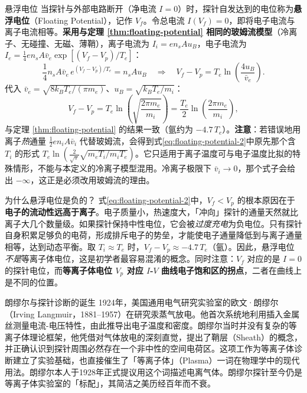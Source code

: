 \documentclass[12pt,a4paper,openany,oneside]{book}
\begin{document}
\begin{definition}{悬浮电位}{}{}
当探针与外部电路断开（净电流 $I = 0$）时，探针自发达到的电位称为\textbf{悬浮电位}（Floating Potential），记作 $V_f$。令总电流 $I(V_f)=0$，即将电子电流与离子电流相等。\textbf{采用与定理 \ref{thm:floating-potential} 相同的玻姆流模型}（冷离子、无碰撞、无磁、薄鞘），离子电流为 $I_i = e n_s A u_B$，电子电流为 $I_e = \frac14 en_sA\bar v_e\exp[(V_f-V_p)/T_e]$：
\begin{equation}
\frac{1}{4}n_sA\bar v_e\,e^{(V_f-V_p)/T_e} = n_s A u_B
\quad\Longrightarrow\quad
V_f - V_p = T_e \ln\!\left(\frac{4u_B}{\bar v_e}\right).
\label{eq:floating-potential-2}
\end{equation}
代入 $\bar v_e = \sqrt{8k_BT_e/(\pi m_e)}$、$u_B=\sqrt{k_BT_e/m_i}$：
\begin{equation}
V_f - V_p = T_e \ln\!\left(\sqrt{\frac{2\pi m_e}{m_i}}\right)
= \frac{T_e}{2}\ln\!\left(\frac{2\pi m_e}{m_i}\right),
\end{equation}
与定理 \ref{thm:floating-potential} 的结果一致（氩约为 $-4.7\,T_e$）。\textbf{注意}：若错误地用离子\emph{热}通量 $\frac12 en_iA\bar v_i$ 代替玻姆流，会得到式\eqref{eq:floating-potential-2}中原先那个含 $T_i$ 的形式 $T_e\ln\!\left(\frac{2}{\sqrt\pi}\sqrt{m_eT_i/m_iT_e}\right)$。它只适用于离子温度可与电子温度比拟的特殊情形，不能与本定义的冷离子模型混用。冷离子极限下 $\bar v_i\to0$，那个式子会给出 $-\infty$，这正是必须改用玻姆流的理由。
\end{definition}

\begin{insight}{为什么悬浮电位是负的？}{}
式\eqref{eq:floating-potential-2}中，$V_f < V_p$ 的根本原因在于\textbf{电子的流动性远高于离子}。电子质量小，热速度大，「冲向」探针的通量天然就比离子大几个数量级。如果探针保持中性电位，它会被\emph{过度充电}为负电位。只有探针自身积累足够负的电荷，形成排斥电子的势垒，才能使电子通量降低到与离子通量相等，达到动态平衡。取 $T_i \approx T_e$ 时，$V_f - V_p \approx -4.7\,T_e$（氩）。因此，悬浮电位\emph{不是}等离子体电位，这是初学者最容易混淆的概念。同时注意：$V_f$ 对应的是 $I=0$ 的探针电位，而\textbf{等离子体电位 $V_p$ 对应 $I$-$V$ 曲线电子饱和区的拐点}，二者在曲线上是不同的位置。
\end{insight}

\begin{history}{朗缪尔与探针诊断的诞生}{}{}
1924年，美国通用电气研究实验室的欧文·朗缪尔（Irving Langmuir，1881--1957）在研究汞蒸气放电。他首次系统地利用插入金属丝测量电流-电压特性，由此推导出电子温度和密度。朗缪尔当时并没有复杂的等离子体理论框架，他凭借对气体放电的深刻直觉，提出了鞘层（Sheath）的概念，并正确认识到探针周围必然存在一个非中性的空间电荷区。这项工作为等离子体诊断建立了实验基础，也直接催生了「等离子体」（Plasma）一词在物理学中的现代用法。朗缪尔本人于1928年正式提议用这个词描述电离气体。朗缪尔探针至今仍是等离子体实验室的「标配」，其简洁之美历经百年而不衰。
\end{history}
\end{document}
